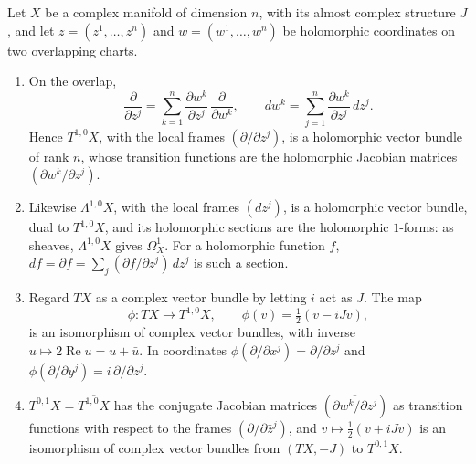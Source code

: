 \begin{proposition}\label{holomorphic-bundles:proposition-holomorphic-tangent}
Let $X$ be a complex manifold of dimension $n$, with its almost complex structure $J$, and let $z = (z^1, \ldots, z^n)$ and $w = (w^1, \ldots, w^n)$ be holomorphic coordinates on two overlapping charts.
\begin{enumerate}
\item On the overlap,
\[
\frac{\partial}{\partial z^j} = \sum_{k=1}^n\frac{\partial w^k}{\partial z^j}\,\frac{\partial}{\partial w^k}, \qquad dw^k = \sum_{j=1}^n\frac{\partial w^k}{\partial z^j}\,dz^j .
\]
Hence $T^{1,0}X$, with the local frames $(\partial/\partial z^j)$, is a holomorphic vector bundle of rank $n$, whose transition functions are the holomorphic Jacobian matrices $(\partial w^k/\partial z^j)$.
\item Likewise $\Lambda^{1,0}X$, with the local frames $(dz^j)$, is a holomorphic vector bundle, dual to $T^{1,0}X$, and its holomorphic sections are the holomorphic $1$-forms: as sheaves, $\Lambda^{1,0}X$ gives
$\Omega^1_X$. For a holomorphic function $f$, $df = \partial f = \sum_j(\partial f/\partial z^j)\,dz^j$ is such a section.
\item Regard $TX$ as a complex vector bundle by letting $i$ act as $J$. The map
\[
\phi \colon TX \to T^{1,0}X, \qquad \phi(v) = \tfrac12(v - iJv),
\]
is an isomorphism of complex vector bundles, with inverse $u \mapsto 2\operatorname{Re}u = u + \bar u$. In coordinates $\phi(\partial/\partial x^j) = \partial/\partial z^j$ and $\phi(\partial/\partial y^j) = i\,\partial/\partial z^j$.
\item $T^{0,1}X = \overline{T^{1,0}X}$ has the conjugate Jacobian matrices $(\overline{\partial w^k/\partial z^j})$ as transition functions with respect to the frames $(\partial/\partial\bar z^j)$, and $v \mapsto \frac12(v + iJv)$ is an
isomorphism of complex vector bundles from $(TX, -J)$ to $T^{0,1}X$.
\end{enumerate}
\end{proposition}

